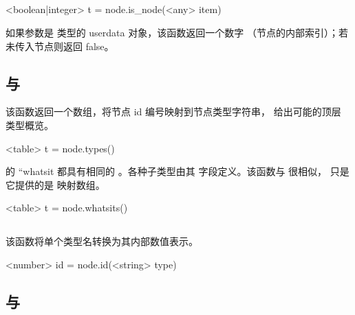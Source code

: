 \subsection{}



\begin{typing}
<boolean|integer> t =
    node.is_node(<any> item)
\end{typing}

如果参数是  类型的 userdata 对象，该函数返回一个数字
（节点的内部索引）；若未传入节点则返回 false。

\subsection{ 与 }


该函数返回一个数组，将节点 id 编号映射到节点类型字符串，
给出可能的顶层  类型概览。

\begin{typing}
<table> t =
    node.types()
\end{typing}

\TEX 的 ``whatsit 都具有相同的 。各种子类型由其
 字段定义。该函数与  很相似，
只是它提供的是  映射数组。

\begin{typing}
<table> t =
    node.whatsits()
\end{typing}

\subsection{}


该函数将单个类型名转换为其内部数值表示。

\begin{typing}
<number> id =
    node.id(<string> type)
\end{typing}

\subsection{ 与 }


